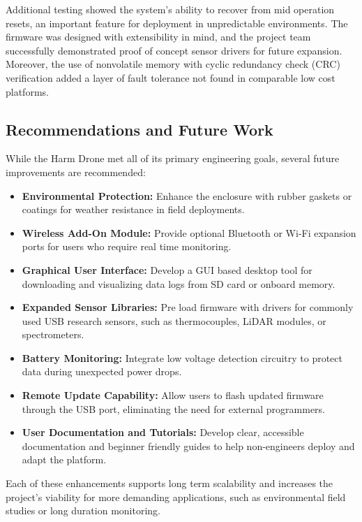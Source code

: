\documentclass[12pt]{article}
\begin{document}
\par Additional testing showed the system’s ability to recover from mid operation resets, an important feature for deployment in unpredictable environments. The firmware was designed with extensibility in mind, and the project team successfully demonstrated proof of concept sensor drivers for future expansion. Moreover, the use of nonvolatile memory with cyclic redundancy check (CRC) verification added a layer of fault tolerance not found in comparable low cost platforms.

\subsection{Recommendations and Future Work}

While the Harm Drone met all of its primary engineering goals, several future improvements are recommended:

\begin{itemize}
\item \textbf{Environmental Protection:} Enhance the enclosure with rubber gaskets or coatings for weather resistance in field deployments.
\item \textbf{Wireless Add-On Module:} Provide optional Bluetooth or Wi-Fi expansion ports for users who require real time monitoring.
\item \textbf{Graphical User Interface:} Develop a GUI based desktop tool for downloading and visualizing data logs from SD card or onboard memory.
\item \textbf{Expanded Sensor Libraries:} Pre load firmware with drivers for commonly used USB research sensors, such as thermocouples, LiDAR modules, or spectrometers.
\item \textbf{Battery Monitoring:} Integrate low voltage detection circuitry to protect data during unexpected power drops.
\item \textbf{Remote Update Capability:} Allow users to flash updated firmware through the USB port, eliminating the need for external programmers.
\item \textbf{User Documentation and Tutorials:} Develop clear, accessible documentation and beginner friendly guides to help non-engineers deploy and adapt the platform.
\end{itemize}

\par Each of these enhancements supports long term scalability and increases the project’s viability for more demanding applications, such as environmental field studies or long duration monitoring.
\end{document}
